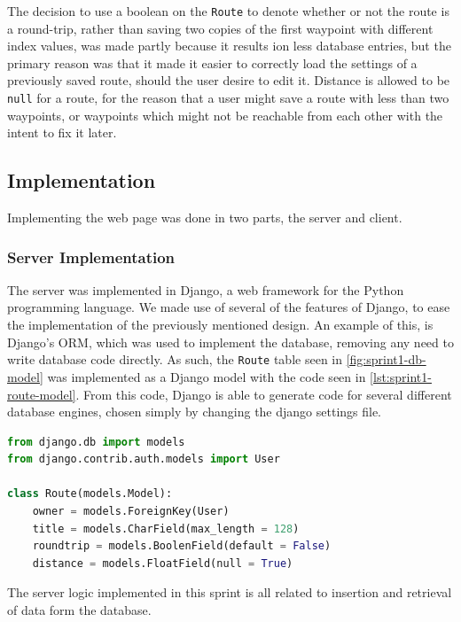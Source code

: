 The decision to use a boolean on the \texttt{Route} to denote whether or not the route is a round-trip, rather than saving two copies of the first waypoint with different index values, was made partly because it results ion less database entries, but the primary reason was that it made it easier to correctly load the settings of a previously saved route, should the user desire to edit it. Distance is allowed to be \texttt{null} for a route, for the reason that a user might save a route with less than two waypoints, or waypoints which might not be reachable from each other with the intent to fix it later.

\subsection{Implementation}

Implementing the web page was done in two parts, the server and client.

\subsubsection{Server Implementation}

The server was implemented in Django\cite{djangoproject}, a web framework for the Python programming language. We made use of several of the features of Django, to ease the implementation of the previously mentioned design. An example of this, is Django's \ac{ORM}, which was used to implement the database, removing any need to write database code directly. As such, the \texttt{Route} table seen in \autoref{fig:sprint1-db-model} was implemented as a Django model with the code seen in \autoref{lst:sprint1-route-model}. From this code, Django is able to generate code for several different database engines, chosen simply by changing the django settings file.

\begin{lstlisting}[language=Python,label={lst:sprint1-route-model},caption={Sprint 1 "Route" Model}]
from django.db import models
from django.contrib.auth.models import User

class Route(models.Model):
	owner = models.ForeignKey(User)
	title = models.CharField(max_length = 128)
	roundtrip = models.BoolenField(default = False)
	distance = models.FloatField(null = True)
\end{lstlisting}

The server logic implemented in this sprint is all related to insertion and retrieval of data form the database.

